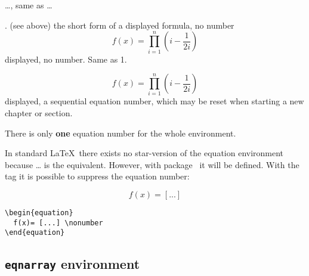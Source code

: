 \begin{compactenum}
%
\item {}\ldots{}, same as
\CMD{[} \ldots \CMD{]}
%
\item \CMD{[\ldots}\CMD{]}. (see above) the short form of a displayed formula, no number%
\mPar{\texttt{\textbackslash[\ldots\textbackslash{}]}}
\[
f(x)=\prod_{i=1}^{n}\left(i-\frac{1}{2i}\right)
\]
%
displayed, no number. Same as 1.
%
\item {}%
%
%
\begin{equation}
f(x)=\prod_{i=1}^{n}\left(i-\frac{1}{2i}\right)
\end{equation}
%
displayed, a sequential equation number, which may be reset when
starting a new chapter or section.


\begin{compactenum}
\item There is only \textbf{one} equation number for the whole environment.
\item {}In standard  \LaTeX\ there exists no star-version of the equation environment 
because \CIndex{[}\ldots\CIndex{]} is the equivalent. However, with package \AmSmath\ it will be defined. With the tag
 it is possible to suppress the equation number:

\begin{minipage}{0.5\linewidth}
\begin{equation}
  f(x)= [...] \nonumber
\end{equation}
\end{minipage}%
\begin{minipage}{0.6\linewidth}
\begin{lstlisting}
\begin{equation}
  f(x)= [...] \nonumber
\end{equation}
\end{lstlisting}
\end{minipage}
%
\end{compactenum}
\end{compactenum}


\subsection{\texttt{eqnarray} environment}\label{display:eqnarray}

